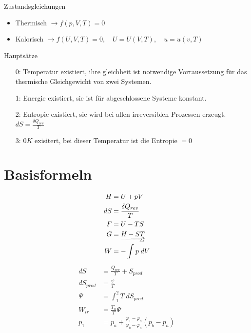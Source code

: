 \documentclass[twocolumn]{article}
\begin{document}
Zustandsgleichungen
\begin{itemize}
	\item Thermisch $\rightarrow f(p, V, T) = 0$ 
	\item Kalorisch $\rightarrow f(U, V, T) = 0, \quad  U = U(V,T), \quad u = u(v,T)$ 
\end{itemize}

\Large Hauptsätze
\normalsize 
\begin{itemize}
	\item[0:] Temperatur existiert, ihre gleichheit ist notwendige Vorraussetzung für das thermische Gleichgewicht von zwei Systemen. 
	\item[1:] Energie existiert, sie ist für abgeschlossene Systeme konstant.  
	\item[2:] Entropie existiert, sie wird bei allen irreversiblen Prozessen erzeugt. $dS = \frac{\delta Q_{rev}}{T}$
	\item[3:] $0K$ exisitert, bei dieser Temperatur ist die Entropie $= 0$ 
\end{itemize}

%                                                                

\section{Basisformeln}

\begin{multicols}{2}
\begin{align*}
	H 	&=	U + pV 				\\ 	
       	dS 	&=	\frac{\delta Q_{rev}}{T}	\\
	F 	&=	U-TS 				\\
	G 	&=	\underrightswishingghost{H-ST}	\\
	W 	&=	-\int_{}^{} p\; dV		\\
	\end{align*}
	\begin{align*}
       	dS 		&=  	\frac{Q_{rev}}{T} + S_{prod}	\\
	dS_{prod}	&=	\frac{\psi}{T} 			\\
	\Psi 		&= 	\int_{1}^{2} T\; dS_{prod}	\\
	W_{ir}		&=	\frac{T_u}{T}\Psi		\\
	p_1 		&= p_a  + \frac{\varphi_1 - \varphi_a}{\varphi_b- \varphi_a}(p_b - p_a) \\
\end{align*}
\end{multicols}
\end{document}
